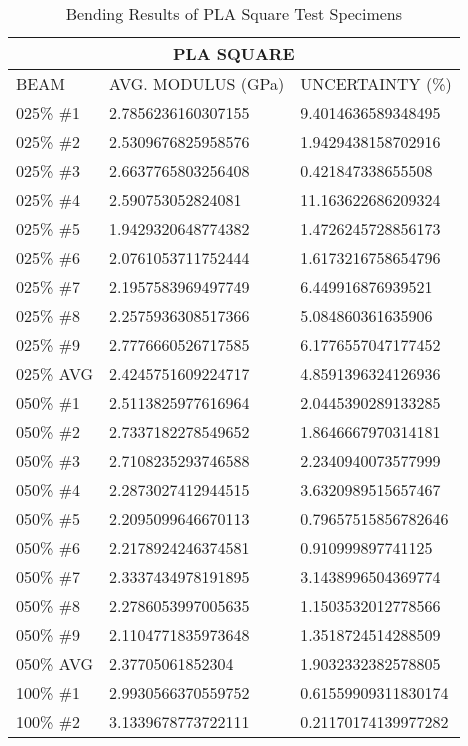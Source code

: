 \begin{longtable}{ | X | X | X | }
	\caption{Bending Results of PLA Square Test Specimens}
	\label{tab:pla_square_data}
	\endhead
	\hline
	\multicolumn{3}{|c|}{PLA SQUARE} \\ \hline
	BEAM & AVG. MODULUS (GPa) & UNCERTAINTY (\%) \\ \hline
	025\% \#1 & 2.7856236160307155 & 9.4014636589348495 \\ \hline
	025\% \#2 & 2.5309676825958576 & 1.9429438158702916 \\ \hline
	025\% \#3 & 2.6637765803256408 & 0.421847338655508 \\ \hline
	025\% \#4 & 2.590753052824081 & 11.163622686209324 \\ \hline
	025\% \#5 & 1.9429320648774382 & 1.4726245728856173 \\ \hline
	025\% \#6 & 2.0761053711752444 & 1.6173216758654796 \\ \hline
	025\% \#7 & 2.1957583969497749 & 6.449916876939521 \\ \hline
	025\% \#8 & 2.2575936308517366 & 5.084860361635906 \\ \hline
	025\% \#9 & 2.7776660526717585 & 6.1776557047177452 \\ \hline
	025\% AVG & 2.4245751609224717 & 4.8591396324126936 \\ \hline
	050\% \#1 & 2.5113825977616964 & 2.0445390289133285 \\ \hline
	050\% \#2 & 2.7337182278549652 & 1.8646667970314181 \\ \hline
	050\% \#3 & 2.7108235293746588 & 2.2340940073577999 \\ \hline
	050\% \#4 & 2.2873027412944515 & 3.6320989515657467 \\ \hline
	050\% \#5 & 2.2095099646670113 & 0.79657515856782646 \\ \hline
	050\% \#6 & 2.2178924246374581 & 0.910999897741125 \\ \hline
	050\% \#7 & 2.3337434978191895 & 3.1438996504369774 \\ \hline
	050\% \#8 & 2.2786053997005635 & 1.1503532012778566 \\ \hline
	050\% \#9 & 2.1104771835973648 & 1.3518724514288509 \\ \hline
	050\% AVG & 2.37705061852304 & 1.9032332382578805 \\ \hline
	100\% \#1 & 2.9930566370559752 & 0.61559909311830174 \\ \hline
	100\% \#2 & 3.1339678773722111 & 0.21170174139977282 \\ \hline

\end{longtable}
